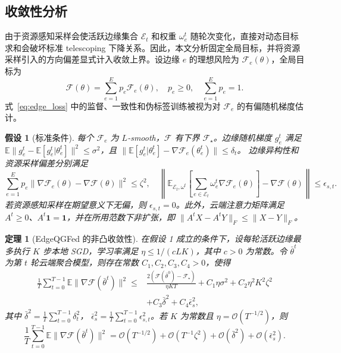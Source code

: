 \documentclass[journal]{IEEEtran}
\newtheorem{assumption}{假设}
\newtheorem{theorem}{定理}
\begin{document}
\subsection{收敛性分析}
\label{subsec:convergence}

由于资源感知采样会使活跃边缘集合 $\mathcal{E}_t$ 和权重 $\omega_e^t$ 随轮次变化，直接对动态目标求和会破坏标准 telescoping 下降关系。因此，本文分析固定全局目标，并将资源采样引入的方向偏差显式计入收敛上界。设边缘 $e$ 的理想风险为 $\mathcal{F}_e(\theta)$，全局目标为
\begin{equation}
    \mathcal{F}(\theta)=
    \sum_{e=1}^{E}p_e\mathcal{F}_e(\theta),
    \quad
    p_e\ge0,\quad \sum_{e=1}^{E}p_e=1 .
    \label{eq:fixed_global_objective}
\end{equation}
式~\eqref{eq:edge_loss} 中的监督、一致性和伪标签训练被视为对 $\mathcal{F}_e$ 的有偏随机梯度估计。

\begin{assumption}[标准条件]
每个 $\mathcal{F}_e$ 为 $L$-smooth，$\mathcal{F}$ 有下界 $\mathcal{F}_\star$。边缘随机梯度 $g_e^t$ 满足
$\mathbb{E}\|g_e^t-\mathbb{E}[g_e^t|\theta_e^t]\|^2\le\sigma^2$，且
$\|\mathbb{E}[g_e^t|\theta_e^t]-\nabla\mathcal{F}_e(\theta_e^t)\|\le\delta_t$。
边缘异构性和资源采样偏差分别满足
\begin{equation}
    \sum_{e=1}^{E}p_e
    \|\nabla\mathcal{F}_e(\theta)-\nabla\mathcal{F}(\theta)\|^2
    \le \zeta^2,\quad
    \left\|\mathbb{E}_{\mathcal{E}_t,\omega^t}\!\left[
    \sum_{e\in\mathcal{E}_t}\omega_e^t
    \nabla\mathcal{F}_e(\theta)\right]
    -\nabla\mathcal{F}(\theta)\right\|
    \le \epsilon_{s,t}.
    \label{eq:convergence_assumption}
\end{equation}
若资源感知采样在期望意义下无偏，则 $\epsilon_{s,t}=0$。此外，云端注意力矩阵满足 $A^t\ge0$、$A^t\mathbf{1}=\mathbf{1}$，并在所用范数下非扩张，即 $\|A^tX-A^tY\|_F\le\|X-Y\|_F$。
\end{assumption}

\begin{theorem}[EdgeQGFed 的非凸收敛性]
在假设 1 成立的条件下，设每轮活跃边缘最多执行 $K$ 步本地 SGD，学习率满足 $\eta\le 1/(cLK)$，其中 $c>0$ 为常数。令 $\bar{\theta}^t$ 为第 $t$ 轮云端聚合模型，则存在常数 $C_1,C_2,C_3,C_4>0$，使得
\begin{align}
    \frac{1}{T}\sum_{t=0}^{T-1}
    \mathbb{E}\|\nabla\mathcal{F}(\bar{\theta}^t)\|^2
    \le&
    \frac{2(\mathcal{F}(\bar{\theta}^0)-\mathcal{F}_\star)}{\eta KT}
    +C_1\eta\sigma^2
    +C_2\eta^2K^2\zeta^2 \nonumber\\
    &+C_3\bar{\delta}^2
    +C_4\bar{\epsilon}_s^2 ,
    \label{eq:convergence_bound}
\end{align}
其中
$\bar{\delta}^2=\frac{1}{T}\sum_{t=0}^{T-1}\delta_t^2$，
$\bar{\epsilon}_s^2=\frac{1}{T}\sum_{t=0}^{T-1}\epsilon_{s,t}^2$。若 $K$ 为常数且 $\eta=\mathcal{O}(T^{-1/2})$，则
\begin{equation}
    \frac{1}{T}\sum_{t=0}^{T-1}
    \mathbb{E}\|\nabla\mathcal{F}(\bar{\theta}^t)\|^2
    =
    \mathcal{O}(T^{-1/2})
    +\mathcal{O}(T^{-1}\zeta^2)
    +\mathcal{O}(\bar{\delta}^2)
    +\mathcal{O}(\bar{\epsilon}_s^2).
    \label{eq:convergence_rate}
\end{equation}
\end{theorem}
\end{document}
